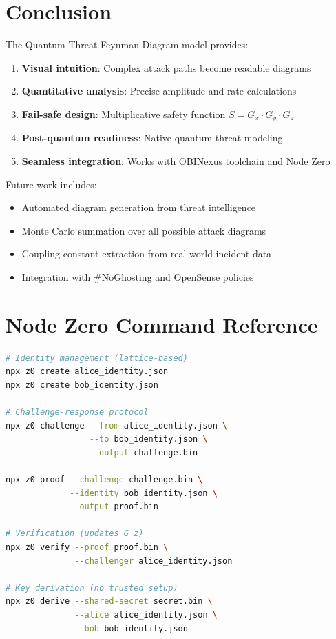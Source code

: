\documentclass[11pt,a4paper]{article}
\begin{document}
\section{Conclusion}

The Quantum Threat Feynman Diagram model provides:

\begin{enumerate}
    \item \textbf{Visual intuition}: Complex attack paths become readable diagrams
    \item \textbf{Quantitative analysis}: Precise amplitude and rate calculations
    \item \textbf{Fail-safe design}: Multiplicative safety function $S = G_x \cdot G_y \cdot G_z$
    \item \textbf{Post-quantum readiness}: Native quantum threat modeling
    \item \textbf{Seamless integration}: Works with OBINexus toolchain and Node Zero
\end{enumerate}

Future work includes:
\begin{itemize}
    \item Automated diagram generation from threat intelligence
    \item Monte Carlo summation over all possible attack diagrams
    \item Coupling constant extraction from real-world incident data
    \item Integration with \#NoGhosting and OpenSense policies
\end{itemize}

\appendix

\section{Node Zero Command Reference}

\begin{lstlisting}[language=bash, basicstyle=\footnotesize\ttfamily]
# Identity management (lattice-based)
npx z0 create alice_identity.json
npx z0 create bob_identity.json

# Challenge-response protocol
npx z0 challenge --from alice_identity.json \
                 --to bob_identity.json \
                 --output challenge.bin

npx z0 proof --challenge challenge.bin \
             --identity bob_identity.json \
             --output proof.bin

# Verification (updates G_z)
npx z0 verify --proof proof.bin \
              --challenger alice_identity.json

# Key derivation (no trusted setup)
npx z0 derive --shared-secret secret.bin \
              --alice alice_identity.json \
              --bob bob_identity.json
\end{lstlisting}
\end{document}
